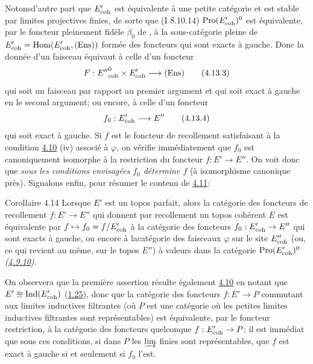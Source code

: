 \documentclass[10pt]{../fichiers-configuration-latex/smfart}
\begin{document}
Notons\pageoriginale d'autre part que $E'_{\mathrm{coh}}$ est équivalente à
une petite catégorie et est stable par limites projectives finies, de sorte que
(I 8.10.14) $\operatorname{Pro}(E'_{\mathrm{coh}})^0$ est équivalente, par le foncteur
pleinement fidèle $\beta_0$ de , à la
sous-catégorie pleine de
$E'_{\mathrm{coh}} = \operatorname{Hom}(E'_{\mathrm{coh}}, (\operatorname{Ens}))$ formée des foncteurs qui
sont exacts à gauche. Donc la donnée d'un faisceau
 équivaut à
celle d'un foncteur
\begin{equation*}
F : {E''}_{\coh}^0 \times E'_{\coh} \to (\Ens)\tag{4.13.3}
\end{equation*}
qui soit un faisceau par rapport au premier argument et qui soit exact
à gauche en le second argument; ou encore, à celle d'un foncteur
\begin{equation*}
f_0 : E'_{\coh} \to E''\tag{4.13.4}
\end{equation*}
qui soit exact à gauche. Si $f$ est le foncteur de recollement
satisfaisant à la condition \hyperref[VI.prop4.10]{4.10} (iv) associé à $\varphi$, on vérifie
immédiatement que $f_0$ est canoniquement isomorphe à la restriction
du foncteur $f : E'\to E''$. On voit donc que \emph{sous les
  conditions envisagées $f_0$ détermine $f$} (à isomorphisme canonique
près). Signalons enfin, pour résumer le contenu de \hyperref[VI.cor4.11]{4.11}:


\begin{enonce*}{Corollaire 4.14}
Lorsque $E'$ est un topos parfait, alors la catégorie des foncteurs de
recollement $f : E'\to E''$ qui donnent par recollement un topos
cohérent $E$ est équivalente par $f \mapsto f_0 = f / E'_{\mathrm{coh}}$ à
la catégorie des foncteurs $f_0 : E'_{\coh} \to E''$ qui sont
exacts à gauche, ou encore à la\pageoriginale catégorie des faisceaux
$\varphi$ sur le site $E''_{\mathrm{coh}}$ (ou, ce qui revient au même, sur le topos
$E''$) à valeurs dans la catégorie $\operatorname{Pro}(E'_{\mathrm{coh}})^0$ \emph{(\cf \hyperref[VI.subsubsec4.9.10]{4.9.10})}.
\end{enonce*}

On observera que la première assertion résulte également
\hyperref[VI.prop4.10]{4.10} en notant que $E' \approxeq \operatorname{Ind} (E'_{\mathrm{coh}})$
(\hyperref[VI.cor1.25]{1.25}), donc que la catégorie des foncteurs $f : E'\to
P$ commutant aux limites inductives filtrantes (où $P$ est une
catégorie où les petites limites inductives filtrantes sont
représentables) est équivalente, par le foncteur restriction, à la
catégorie des foncteurs quelconque $f : E'_{\coh} \to P$; il est
immédiat que sous ces conditions, si dans $P$ les $\varinjlim$
finies sont représentables, que $f$ est exact à gauche si et
seulement si $f_0$ l'est.
\end{document}
